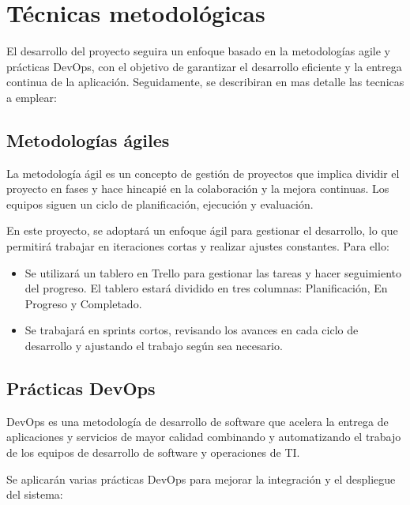 
\section{Técnicas metodológicas}
El desarrollo del proyecto seguira un enfoque basado en la metodologías agile y prácticas DevOps, con el objetivo de garantizar el desarrollo eficiente y la entrega continua de la aplicación. Seguidamente, se describiran en mas detalle las tecnicas a emplear:

\subsection{Metodologías ágiles}

La metodología ágil es un concepto de gestión de proyectos que implica dividir el proyecto en fases y hace hincapié en la colaboración y la mejora continuas. Los equipos siguen un ciclo de planificación, ejecución y evaluación. \cite{AtlassianAgile}

En este proyecto, se adoptará un enfoque ágil para gestionar el desarrollo, lo que permitirá trabajar en iteraciones cortas y realizar ajustes constantes. Para ello:

\begin{itemize}
    \item Se utilizará un tablero en Trello para gestionar las tareas y hacer seguimiento del progreso. El tablero estará dividido en tres columnas:  Planificación, En Progreso y Completado.
    \item Se trabajará en sprints cortos, revisando los avances en cada ciclo de desarrollo y ajustando el trabajo según sea necesario.
\end{itemize}

\subsection{Prácticas DevOps}

DevOps es una metodología de desarrollo de software que acelera la entrega de aplicaciones y servicios de mayor calidad combinando y automatizando el trabajo de los equipos de desarrollo de software y operaciones de TI. \cite{IBMDevOps}

Se aplicarán varias prácticas DevOps para mejorar la integración y el despliegue del sistema:

